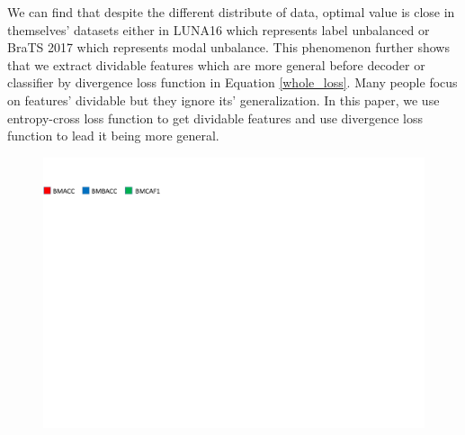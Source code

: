 \documentclass[journal]{IEEEtran}
\begin{document}
We can find that despite the different distribute of data, optimal value is close in themselves' datasets either in LUNA16 which represents label unbalanced or BraTS 2017 which represents modal unbalance. This phenomenon further shows that we extract dividable features which are more general before decoder or classifier by divergence loss function in Equation \ref{whole_loss}. Many people focus on features' dividable but they ignore its' generalization. In this paper, we use entropy-cross loss function to get dividable features and use divergence loss function to lead it being more general.

\begin{figure}
	\centering
	\includegraphics[scale=0.25,trim=0 550 0 0]{./picture/alpha_fig_ledgend.pdf}

\end{figure}
\end{document}
